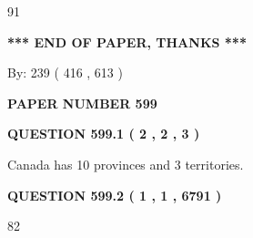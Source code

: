 \documentclass[12pt]{article}
\begin{document}
91
 
 
   
   
 \vspace{0.2in}
 
   
   
   
   
\vspace{1.0in} 
{\textbf{\large{ *** END OF PAPER, THANKS *** }}} 
   
   
\hspace{1.0in} By: 
 239 ( 416 ,  613 )
   
   
   
   
\newpage 
\setcounter{page}{ 
   599001 } 
   
   
   
   
 {\textbf{ \Large{ PAPER NUMBER  599  }}}
   
   
\vspace{0.2in}
   
   
   
   
   
   
 \vspace{0.2in}
 
 
 
 
   
   
  
\vspace{0.2in}
  
{\textbf{\Large{QUESTION
599.1 
 ( 2 , 2 , 3 )
}}}
  
  
 
 
\noindent{}
 
 
Canada has 10  provinces and 3 territories.
 
 
 
 
  
\vspace{0.2in}
  
{\textbf{\Large{QUESTION
599.2 
 ( 1 , 1 , 6791 )
}}}
  
  
 
 
\noindent{}

82
 
 
   
   
 \vspace{0.2in}
 
   
   
\end{document}
